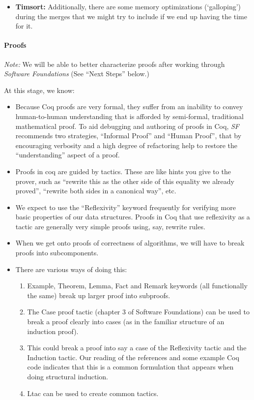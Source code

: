 \documentclass{article}
\begin{document}
\begin{itemize}
  \item \textbf{Timsort:}
  Additionally, there are some memory optimizations (`galloping') during the
merges that we might try to include if we end up having the time for it.
\end{itemize}

\paragraph{Proofs}  %
\emph{Note:} We will be able to better characterize proofs after
working through \emph{Software Foundations} \cite{sf}
(See ``Next Steps'' below.)

At this stage, we know:
\begin{itemize}
\item
  Because Coq proofs are very formal, they suffer from an inability to
  convey human-to-human understanding that is afforded by
  semi-formal, traditional mathematical proof.
  To aid debugging and authoring of proofs in Coq,
  \emph{SF} \cite{sf} recommends two strategies, ``Informal Proof''
  and ``Human Proof'', that by encouraging verbosity and a high degree
  of refactoring
  help to restore the ``understanding'' aspect of a proof.
\item Proofs in coq are guided by tactics. These are like hints you
  give to the prover, such as ``rewrite this as the other side of this
  equality we already proved'', ``rewrite both sides in a canonical
  way'',  etc.
\item We expect to use the ``Reflexivity'' keyword frequently for
  verifying more
  basic properties of our data structures.
  Proofs in Coq that use reflexivity as a tactic are generally very
  simple proofs using, say, rewrite rules.
\item When we get onto proofs of correctness of algorithms, we will
  have to break proofs into subcomponents.
\item There are various ways of doing this:
\begin{enumerate}
\item Example, Theorem, Lemma, Fact and Remark keywords (all
  functionally the same) break up larger proof into subproofs.
\item The Case proof tactic (chapter 3 of Software Foundations) can be
  used to break a proof clearly into cases (as in the familiar
  structure of an induction proof).
\item This could break a proof into say a case of the Reflexivity
  tactic and the Induction tactic.
  Our reading of the references and some example Coq code
  indicates that this is a common formulation that appears
  when doing structural induction.
\item Ltac can be used to create common tactics.
\end{enumerate}

\end{itemize}
\end{document}
